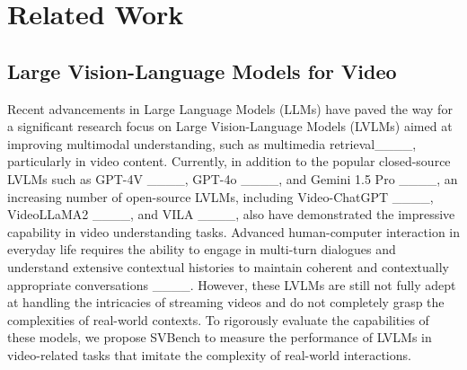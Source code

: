 \section{Related Work}
\subsection{Large Vision-Language Models for Video}
Recent advancements in Large Language Models (LLMs) have paved the way for a significant research focus on Large Vision-Language Models (LVLMs) aimed at improving multimodal understanding, such as multimedia retrieval____, particularly in video content.
%
Currently, in addition to the popular closed-source LVLMs such as GPT-4V ____, GPT-4o ____, and Gemini 1.5 Pro ____, an increasing number of open-source LVLMs, including Video-ChatGPT ____, VideoLLaMA2 ____, and VILA ____, also have demonstrated the impressive capability in video understanding tasks. 
%
Advanced human-computer interaction in everyday life requires the ability to engage in multi-turn dialogues and understand extensive contextual histories to maintain coherent and contextually appropriate conversations ____.
%
However, these LVLMs are still not fully adept at handling the intricacies of streaming videos and do not completely grasp the complexities of real-world contexts.
%
%
% 
To rigorously evaluate the capabilities of these models, we propose SVBench to measure the performance of LVLMs in video-related tasks that imitate the complexity of real-world interactions.

